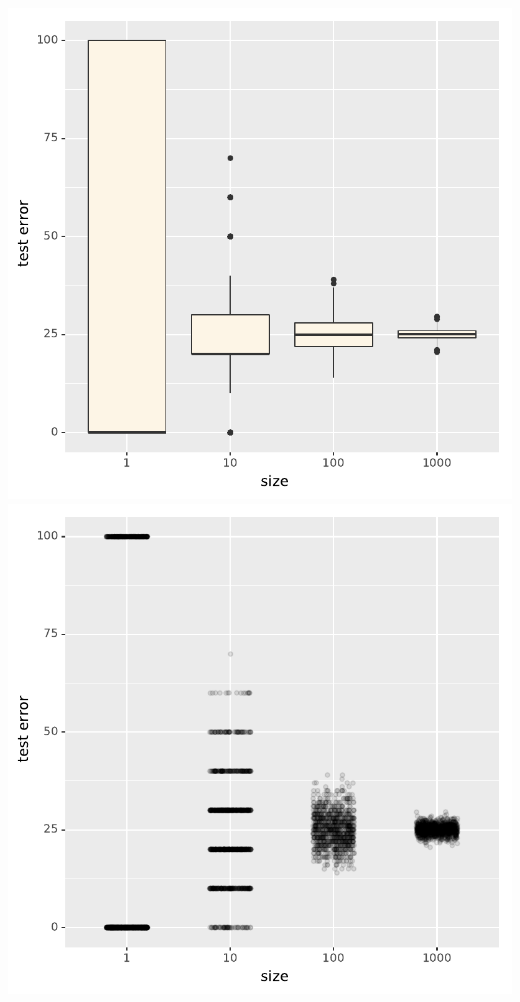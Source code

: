 \documentclass[landscape,footrule]{foils}
\begin{document}
\enlargethispage{1cm}
\centerline{
\includegraphics[scale=0.8]{test_error_fluctuations_1}\hspace*{0.5cm}
\includegraphics[scale=0.8]{test_error_fluctuations_2}}
\end{document}
